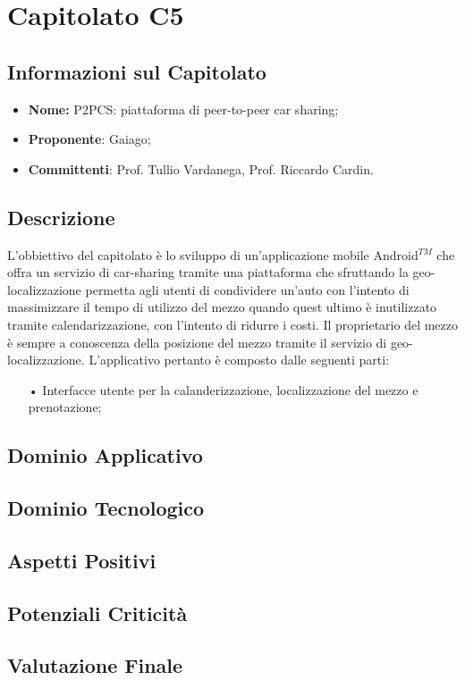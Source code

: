 \section{Capitolato C5}
\subsection{Informazioni sul Capitolato}
\begin{itemize}
	\item \textbf{Nome:} P2PCS: piattaforma di peer-to-peer car sharing;
	\item \textbf{Proponente}: Gaiago;
	\item \textbf{Committenti}: Prof. Tullio Vardanega, Prof. Riccardo Cardin.
\end{itemize}

\subsection{Descrizione}
L'obbiettivo del capitolato è lo sviluppo di un'applicazione mobile Android$^{TM}$ che offra un servizio di car-sharing tramite una piattaforma che sfruttando la geo-localizzazione permetta agli utenti di condividere un'auto con l'intento di massimizzare il tempo di utilizzo del mezzo quando quest ultimo è inutilizzato tramite calendarizzazione, con l'intento di ridurre i costi. Il proprietario del mezzo è sempre a conoscenza della posizione del mezzo tramite il servizio di geo-localizzazione. L'applicativo pertanto è composto dalle seguenti parti:
\begin{itemize}
\item[•] Interfacce utente per la calanderizzazione, localizzazione del mezzo e prenotazione;
\end{itemize}

\subsection{Dominio Applicativo}

\subsection{Dominio Tecnologico}


\subsection{Aspetti Positivi}

\subsection{Potenziali Criticità}

\subsection{Valutazione Finale}


